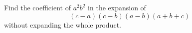 Find the coefficient of $a^2b^2$ in the expansion of
\[(c-a)(c-b)(a-b)(a+b+c)\]
without expanding the whole product.
